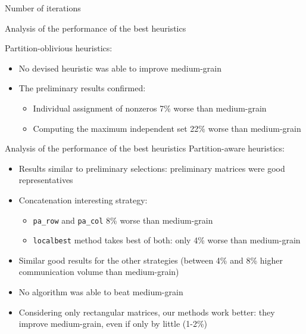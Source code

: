 \begin{frame}{Number of iterations}
{\begin{figure}[h]
		\end{figure}
	}
\end{frame}

\begin{frame}{Analysis of the performance of the best heuristics}

	Partition-oblivious heuristics:

\begin{itemize}\itemsep=0.4cm
		\item No devised heuristic was able to improve medium-grain
		\item The preliminary results confirmed:

		\begin{itemize}\itemsep=0.3cm
				\item Individual assignment of nonzeros 7\% worse than medium-grain
				\item Computing the maximum independent set 22\% worse than medium-grain
			\end{itemize}
	\end{itemize}
\end{frame}

\begin{frame}{Analysis of the performance of the best heuristics}
	Partition-aware heuristics:

	\begin{itemize}
		\item Results similar to preliminary selections: preliminary matrices were good representatives
		\item Concatenation interesting strategy:
			\begin{itemize}
				\item \texttt{pa\_row} and \texttt{pa\_col} 8\% worse than medium-grain
				\item \texttt{localbest} method takes best of both: only 4\% worse than medium-grain 
			\end{itemize}
		\item Similar good results for the other strategies (between 4\% and 8\% higher communication volume than medium-grain)
		\item No algorithm was able to beat medium-grain
		\item Considering only rectangular matrices, our methods work better: they improve medium-grain, even if only by little (1-2\%)
	\end{itemize}
\end{frame}

